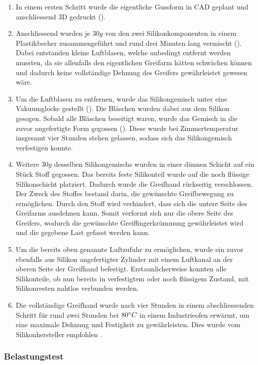 \begin{enumerate}
\item In einem ersten Schritt wurde die eigentliche Gussform in CAD geplant und anschliessend 3D gedruckt ().
\item Anschliessend wurden je $30g$ von den zwei Silikonkomponenten in einem Plastikbecher zusammengeführt und rund drei Minuten lang vermischt (). Dabei entstanden kleine Luftblasen, welche unbedingt entfernt werden mussten, da sie allenfalls den eigentlichen Greifarm hätten schwächen können und dadurch keine vollständige Dehnung des Greifers gewährleistet gewesen wäre.
\item Um die Luftblasen zu entfernen, wurde das Silikongemisch unter eine Vakuumglocke gestellt (). Die Bläschen wurden dabei aus dem Silikon gesogen. Sobald alle Bläschen beseitigt waren, wurde das Gemisch in die zuvor angefertigte Form gegossen (). Diese wurde bei Zimmertemperatur insgesamt vier Stunden stehen gelassen, sodass sich das Silikongemisch verfestigen konnte.
\item Weitere $30g$ desselben Silikongemischs wurden in einer dünnen Schicht auf ein Stück Stoff gegossen. Das bereits feste Silikonteil wurde auf die noch flüssige Silikonschicht platziert. Dadurch wurde die Greifhand rückseitig verschlossen. Der Zweck des Stoffes bestand darin, die gewünschte Greifbewegung zu ermöglichen. Durch den Stoff wird verhindert, dass sich die untere Seite des Greifarms ausdehnen kann. Somit verformt sich nur die obere Seite des Greifers, wodurch die gewünschte Greiffingerkrümmung gewährleistet wird und die gegebene Last gefasst werden kann. 
\item Um die bereits oben genannte Luftzufuhr zu ermöglichen, wurde ein zuvor ebenfalls aus Silikon angefertigter Zylinder mit einem Luftkanal an der oberen Seite der Greifhand befestigt. Erstaunlicherweise konnten alle Silikonteile, ob nun bereits in verfestigtem oder noch flüssigem Zustand, mit Silikonresten nahtlos verbunden werden.
\item Die vollständige Greifhand wurde nach vier Stunden in einem abschliessenden Schritt für rund zwei Stunden bei $80\degree C$ in einem Industrieofen erwärmt, um eine maximale Dehnung und Festigkeit zu gewährleisten. Dies wurde vom Silikonhersteller empfohlen .
\end{enumerate}

\subsubsection{Belastungstest}

